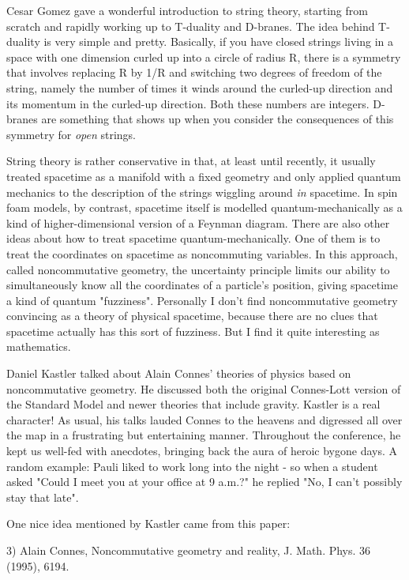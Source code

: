 Cesar Gomez gave a wonderful introduction to string theory, starting
from scratch and rapidly working up to T-duality and D-branes.  The idea
behind T-duality is very simple and pretty.  Basically, if you have
closed strings living in a space with one dimension curled up into a
circle of radius R, there is a symmetry that involves replacing R by 1/R
and switching two degrees of freedom of the string, namely the number of
times it winds around the curled-up direction and its momentum in the
curled-up direction.  Both these numbers are integers.   D-branes are
something that shows up when you consider the consequences of this symmetry 
for \emph{open} strings.   

String theory is rather conservative in that, at least until recently, 
it usually treated spacetime as a manifold with a fixed geometry and
only applied quantum mechanics to the description of the strings
wiggling around \emph{in} spacetime.  In spin foam models, by contrast,
spacetime itself is modelled quantum-mechanically as a kind of
higher-dimensional version of a Feynman diagram.   There are also  other
ideas about how to treat spacetime quantum-mechanically.  One of them is
to treat the coordinates on spacetime as noncommuting variables.  In
this approach, called noncommutative geometry, the uncertainty
principle limits our ability to simultaneously know all the coordinates
of a particle's position, giving spacetime a kind of quantum "fuzziness".
Personally I don't find noncommutative geometry convincing as a theory 
of physical spacetime, because there are no clues that spacetime actually
has this sort of fuzziness.  But I find it quite interesting as mathematics.

Daniel Kastler talked about Alain Connes' theories of physics based on
noncommutative geometry.  He discussed both the original Connes-Lott
version of the Standard Model and newer theories that include gravity. 
Kastler is a real character!  As usual, his talks lauded Connes to the
heavens and digressed all over the map in a frustrating but entertaining
manner.  Throughout the conference, he kept us well-fed with anecdotes,
bringing back the aura of heroic bygone days.  A random example: Pauli
liked to work long into the night - so when a student asked "Could I
meet you at your office at 9 a.m.?" he replied "No, I can't possibly
stay that late".   

One nice idea mentioned by Kastler came from this paper:

3) Alain Connes, Noncommutative geometry and reality, J. Math. Phys.
36 (1995), 6194.

